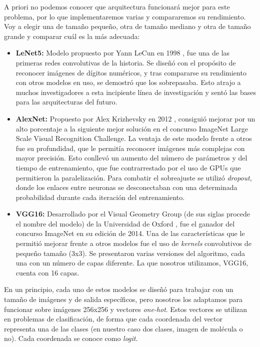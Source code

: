 A priori no podemos conocer que arquitectura funcionará mejor para este problema, por lo que implementaremos varias y compararemos su rendimiento. Voy a elegir una de tamaño pequeño, otra de tamaño mediano y otra de tamaño grande y comparar cuál es la más adecuada:
\begin{itemize}
    \item \textbf{LeNet5:} Modelo propuesto por Yann LeCun en 1998 \cite{lecun1998gradient}, fue una de las primeras redes convolutivas de la historia. Se diseñó con el propósito de reconocer imágenes de dígitos numéricos, y tras compararse su rendimiento con otros modelos en uso, se demostró que los sobrepasaba. Esto atrajo a muchos investigadores a esta incipiente línea de investigación y sentó las bases para las arquitecturas del futuro.
    \item \textbf{AlexNet:} Propuesto por Alex Krizhevsky en 2012 \cite{krizhevsky2012imagenet}, consiguió mejorar por un alto porcentaje a la siguiente mejor solución en el concurso ImageNet Large Scale Visual Recognition Challenge. La ventaja de este modelo frente a otros fue su profundidad, que le permitía reconocer imágenes más complejas con mayor precisión. Esto conllevó un aumento del número de parámetros y del tiempo de entrenamiento, que fue contrarrestado por el uso de GPUs que permitieron la paralelización. Para combatir el sobreajuste se utilizó \textit{dropout}, donde los enlaces entre neuronas se desconectaban con una determinada probabilidad durante cada iteración del entrenamiento.
    \item \textbf{VGG16:} Desarrollado por el Visual Geometry Group (de sus siglas procede el nombre del modelo) de la Universidad de Oxford \cite{https://doi.org/10.48550/arxiv.1409.1556}, fue el ganador del concurso ImageNet en su edición de 2014. Una de las características que le permitió mejorar frente a otros modelos fue el uso de \textit{kernels} convolutivos de pequeño tamaño (3x3). Se presentaron varias versiones del algoritmo, cada una con un número de capas diferente. La que nosotros utilizamos, VGG16, cuenta con 16 capas.
\end{itemize}

En un principio, cada uno de estos modelos se diseñó para trabajar con un tamaño de imágenes y de salida específicos, pero nosotros los adaptamos para funcionar sobre imágenes 256x256 y vectores \textit{one-hot}. Estos vectores se utilizan en problemas de clasificación, de forma que cada coordenada del vector representa una de las clases (en nuestro caso dos clases, imagen de molécula o no). Cada coordenada se conoce como \textit{logit}.

